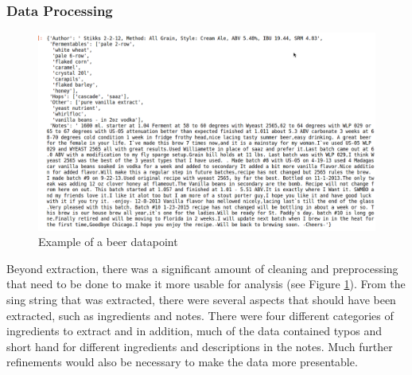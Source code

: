 \documentclass[bibliography=totoc]{article}
\begin{document}
 \subsubsection{Data Processing}
 \begin{figure}
    \includegraphics[height=0.5\textwidth]{beer_data_processing.png}
    \caption{\label{beer_data_processing} Example of a beer datapoint } 
 \end{figure}
 Beyond extraction, there was a significant amount of cleaning and 
 preprocessing that need to be done to make it more usable for 
 analysis (see Figure \ref{beer_data_processing}). From the sing string that was extracted, there were several 
 aspects that should have been extracted, such as ingredients and 
 notes. There were four different categories of ingredients to 
 extract and in addition, much of the data contained typos and 
 short hand for different ingredients and descriptions in the notes. 
 Much further refinements would also be necessary to make the data 
 more presentable. 
\end{document}
